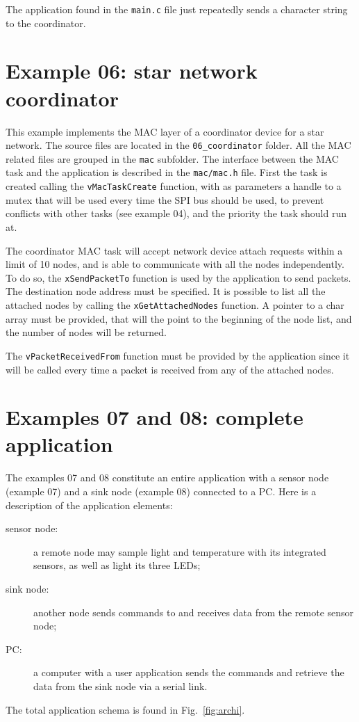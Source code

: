 \documentclass[11pt]{report}
\begin{document}
The application found in the \verb?main.c? file just repeatedly sends a character string to the coordinator.

\section{Example 06: star network coordinator}
This example implements the MAC layer of a coordinator device for a star network. The source files are located in the \verb$06_coordinator$ folder. All the MAC related files are grouped in the \verb$mac$ subfolder. The interface between the MAC task and the application is described in the \verb$mac/mac.h$ file. First the task is created calling the \verb$vMacTaskCreate$ function, with as parameters a handle to a mutex that will be used every time the SPI bus should be used, to prevent conflicts with other tasks (see example 04), and the priority the task should run at.

The coordinator MAC task will accept network device attach requests within a limit of 10 nodes, and is able to communicate with all the nodes independently. To do so, the \verb$xSendPacketTo$ function is used by the application to send packets. The destination node address must be specified. It is possible to list all the attached nodes by calling the \verb$xGetAttachedNodes$ function. A pointer to a char array must be provided, that will the point to the beginning of the node list, and the number of nodes will be returned.

The \verb$vPacketReceivedFrom$ function must be provided by the application since it will be called every time a packet is received from any of the attached nodes.

\section{Examples 07 and 08: complete application}
The examples 07 and 08 constitute an entire application with a sensor node (example 07) and a sink node (example 08) connected to a PC. Here is a description of the application elements:
\begin{description}
	\item[sensor node:] a remote node may sample light and temperature with its integrated sensors, as well as light its three LEDs;
	\item [sink node:] another node sends commands to and receives data from the remote sensor node;
	\item [PC:] a computer with a user application sends the commands and retrieve the data from the sink node via a serial link.
\end{description}
The total application schema is found in Fig.~\ref{fig:archi}.
\end{document}
